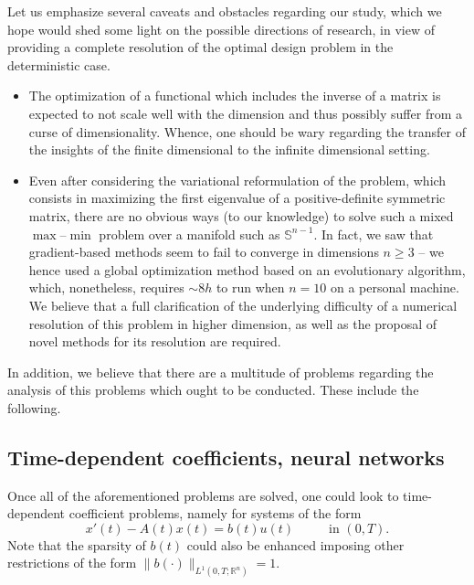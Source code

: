 \documentclass[journal,twoside,web]{ieeecolor}
\newcommand{\R}{\mathbb{R}}
\begin{document}
	Let us emphasize several caveats and obstacles regarding our study, which we hope would shed some light on the possible directions of research, in view of providing a complete resolution of the optimal design problem in the deterministic case. 	
	
	\begin{itemize}
	\item The optimization of a functional which includes the inverse of a matrix is expected to not scale well with the dimension and thus possibly suffer from a curse of dimensionality. Whence, one should be wary regarding the transfer of the insights of the finite dimensional to the infinite dimensional setting.
	\smallskip 
	
	\item Even after considering the variational reformulation of the problem, which consists in maximizing the first eigenvalue of a positive-definite symmetric matrix, there are no obvious ways (to our knowledge) to solve such a mixed $\max$--$\min$ problem over a manifold such as $\mathbb{S}^{n-1}$. 
	In fact, we saw that gradient-based methods seem to fail to converge in dimensions $n\geqslant3$ -- we hence used a global optimization method based on an evolutionary algorithm, which, nonetheless, requires $\sim 8h$ to run when $n=10$ on a personal machine. We believe that a full clarification of the underlying difficulty of a numerical resolution of this problem in higher dimension, as well as the proposal of novel methods for its resolution are required.
	\end{itemize}
	
	In addition, we believe that there are a multitude of problems regarding the analysis of this problems which ought to be conducted. 
	These include the following.
	
	\subsection{Time-dependent coefficients, neural networks}
	Once all of the aforementioned problems are solved, one could look to time-dependent coefficient problems, namely for systems of the form	
	\begin{equation} \label{eq: time.dep}
	x'(t)  - A(t) x(t) = b(t) u(t) \hspace{1cm} \text{ in } (0,T).
	\end{equation}
	Note that the sparsity of $b(t)$ could also be enhanced imposing other restrictions of the form $\|b(\cdot)\|_{L^1(0,T; \R^n)} = 1$.
	
\end{document}
